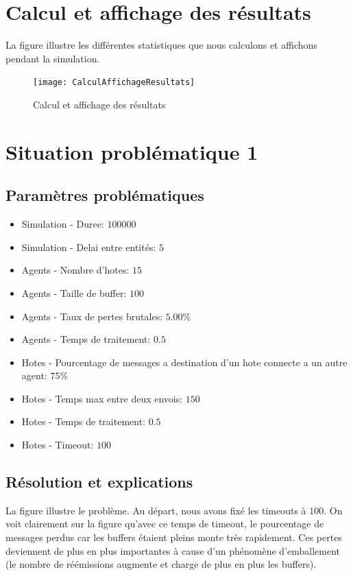 \documentclass[a4paper,11pt]{article}
\begin{document}
\section{Calcul et affichage des résultats}
La figure  illustre les différentes statistiques que nous calculons et affichons pendant la simulation.

\begin{figure}[h!t]
  \centering
    \texttt{[image: CalculAffichageResultats]}
  \caption{Calcul et affichage des résultats}
  \label{fig:calcul-affichage-resultats}
\end{figure}








\section{Situation problématique 1}
\subsection{Paramètres problématiques}
\begin{itemize}
 \item Simulation - Duree: $100000$
 \item Simulation - Delai entre entités: $5$
 \item Agents - Nombre d'hotes: $15$
 \item Agents - Taille de buffer: $100$
 \item Agents - Taux de pertes brutales: $5.00$\%
 \item Agents - Temps de traitement: $0.5$
 \item Hotes - Pourcentage de messages a destination d'un hote connecte a un autre agent: $75$\%
 \item Hotes - Temps max entre deux envois: $150$
 \item Hotes - Temps de traitement: $0.5$
 \item Hotes - Timeout: \textbf{$100$}
\end{itemize}



\subsection{Résolution et explications}
La figure  illustre le problème. Au départ, nous avons fixé les timeouts à $100$. On voit clairement sur la figure qu'avec ce temps de timeout, le pourcentage de messages perdus car les buffers étaient pleins monte très rapidement. Ces pertes deviennent de plus en plus importantes à cause d'un phénomène d'emballement (le nombre de réémissions augmente et charge de plus en plus les buffers).
\end{document}
